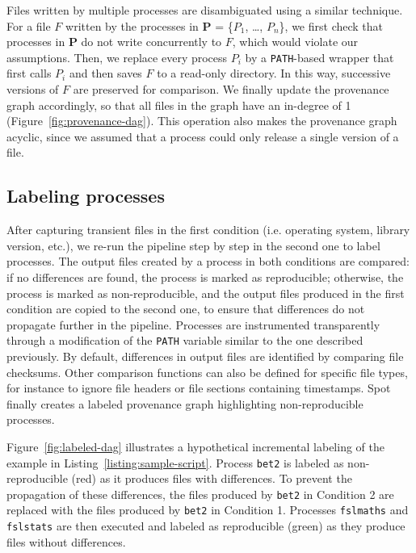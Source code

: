 \documentclass[a4paper,num-refs]{oup-contemporary}
\newcommand{\toolname}[0]{Spot\xspace}
\begin{document}
Files written by multiple processes are disambiguated using a similar technique. For a
 file $F$ written by the processes in \textbf{P} = \{$P_{1}$, \ldots,
 $P_{n}$\}, we first check that processes in \textbf{P} do not
 write concurrently to $F$, which would violate our assumptions. Then, we
 replace every process $P_{i}$ by a \texttt{PATH}-based wrapper that first
 calls $P_{i}$ and then saves $F$ to a read-only directory. In this way,
 successive versions of $F$ are preserved for comparison. We finally
 update the provenance graph accordingly, so that all files in the graph
 have an in-degree of 1 (Figure~\ref{fig:provenance-dag}). This operation also makes the provenance graph
 acyclic, since we assumed that a process could only release a single version of a file.

\subsection{Labeling processes} 

After capturing transient files in the first condition (i.e. operating system, library version, etc.),
we re-run the pipeline
step by step in the second one to label processes. The output files
created by a process in both conditions are compared: if no differences are found, the process is marked as
reproducible; otherwise, the process is marked as non-reproducible, and the
output files produced in the first condition are copied to the second one, to ensure
that differences do not propagate further in the pipeline. Processes are
instrumented transparently through a modification of the \texttt{PATH}
variable similar to the one described previously. By default, differences
in output files are identified by comparing file checksums. Other
comparison functions can also be defined for specific file types, for
instance to ignore file headers or file sections containing timestamps.
\toolname finally creates a labeled
provenance graph highlighting non-reproducible processes.

Figure~\ref{fig:labeled-dag} illustrates a hypothetical incremental
labeling of the example in Listing~\ref{listing:sample-script}. Process
\texttt{bet2} is labeled as non-reproducible (red) as it produces files
with differences. To prevent the propagation of these differences, the
files produced by \texttt{bet2} in Condition 2 are replaced with the
files produced by \texttt{bet2} in Condition 1. Processes
\texttt{fslmaths} and \texttt{fslstats} are then executed and
labeled as reproducible (green) as they produce files without differences.
\end{document}
